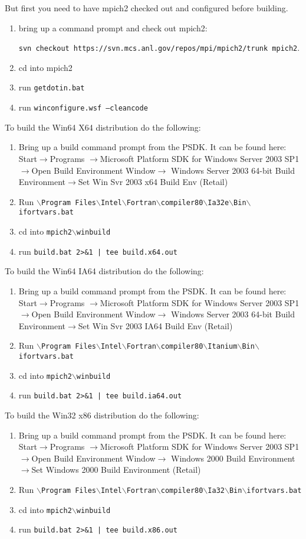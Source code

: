 \documentclass[dvipdfm,11pt]{article}
\begin{document}
But first you need to have mpich2 checked out and configured before building.
\begin{enumerate}
\item bring up a command prompt and check out mpich2: 

\texttt{svn checkout https://svn.mcs.anl.gov/repos/mpi/mpich2/trunk mpich2}.
\item cd into mpich2
\item run \texttt{getdotin.bat}
\item run \texttt{winconfigure.wsf --cleancode}
\end{enumerate}

To build the Win64 X64 distribution do the following:
\begin{enumerate}
\item Bring up a build command prompt from the PSDK.  It can be found here: Start$\to$Programs
$\to$Microsoft Platform SDK for Windows Server 2003 SP1$\to$Open Build Environment Window$\to$
Windows Server 2003 64-bit Build Environment$\to$Set Win Svr 2003 x64 Build Env (Retail)
\item Run \texttt{$\backslash$Program Files$\backslash$Intel$\backslash$Fortran$\backslash$compiler80$\backslash$Ia32e$\backslash$Bin$\backslash$ifortvars.bat}
\item cd into \texttt{mpich2$\backslash$winbuild}
\item run \texttt{build.bat 2>\&1 | tee build.x64.out}
\end{enumerate}

To build the Win64 IA64 distribution do the following:
\begin{enumerate}
\item Bring up a build command prompt from the PSDK.  It can be found here: Start$\to$Programs
$\to$Microsoft Platform SDK for Windows Server 2003 SP1$\to$Open Build Environment Window$\to$
Windows Server 2003 64-bit Build Environment$\to$Set Win Svr 2003 IA64 Build Env (Retail)
\item Run \texttt{$\backslash$Program Files$\backslash$Intel$\backslash$Fortran$\backslash$compiler80$\backslash$Itanium$\backslash$Bin$\backslash$ifortvars.bat}
\item cd into \texttt{mpich2$\backslash$winbuild}
\item run \texttt{build.bat 2>\&1 | tee build.ia64.out}
\end{enumerate}

To build the Win32 x86 distribution do the following:
\begin{enumerate}
\item Bring up a build command prompt from the PSDK.  It can be found here: Start$\to$Programs
$\to$Microsoft Platform SDK for Windows Server 2003 SP1$\to$Open Build Environment Window$\to$
Windows 2000 Build Environment$\to$Set Windows 2000 Build Environment (Retail)
\item Run \texttt{$\backslash$Program Files$\backslash$Intel$\backslash$Fortran$\backslash$compiler80$\backslash$Ia32$\backslash$Bin$\backslash$ifortvars.bat}
\item cd into \texttt{mpich2$\backslash$winbuild}
\item run \texttt{build.bat 2>\&1 | tee build.x86.out}
\end{enumerate}
\end{document}
